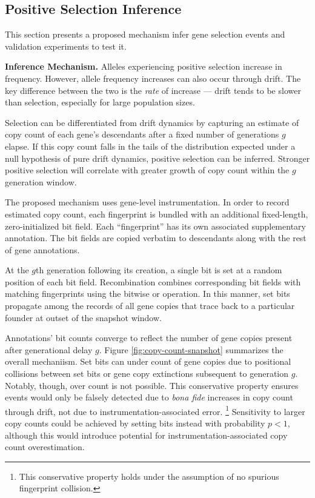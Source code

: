 \subsection{Positive Selection Inference}
\label{sec:selection-inference}

This section presents a proposed mechanism infer gene selection events and validation experiments to test it.


\textbf{Inference Mechanism.}
Alleles experiencing positive selection increase in frequency.
However, allele frequency increases can also occur through drift.
The key difference between the two is the \textit{rate} of increase --- drift tends to be slower than selection, especially for large population sizes.

Selection can be differentiated from drift dynamics by capturing an estimate of copy count of each gene's descendants after a fixed number of generations $g$ elapse.
If this copy count falls in the tails of the distribution expected under a null hypothesis of pure drift dynamics, positive selection can be inferred.
Stronger positive selection will correlate with greater growth of copy count within the $g$ generation window.

The proposed mechanism uses gene-level instrumentation.
In order to record estimated copy count, each fingerprint is bundled with an additional fixed-length, zero-initialized bit field.
Each ``fingerprint'' has its own associated supplementary annotation.
The bit fields are copied verbatim to descendants along with the rest of gene annotations.

At the $g$th generation following its creation, a single bit is set at a random position of each bit field.
Recombination combines corresponding bit fields with matching fingerprints using the bitwise or operation.
In this manner, set bits propagate among the records of all gene copies that trace back to a particular founder at outset of the snapshot window.

Annotations' bit counts converge to reflect the number of gene copies present after generational delay $g$.
Figure \ref{fig:copy-count-snapshot} summarizes the overall mechaniism.
Set bits can under count of gene copies due to positional collisions between set bits or gene copy extinctions subsequent to generation $g$.
Notably, though, over count is not possible.
This conservative property ensures events would only be falsely detected due to \textit{bona fide} increases in copy count through drift, not due to instrumentation-associated error.%
\footnote{This conservative property holds under the assumption of no spurious fingerprint collision.}
Sensitivity to larger copy counts could be achieved by setting bits instead with probability $p < 1$, although this would introduce potential for instrumentation-associated copy count overestimation.

